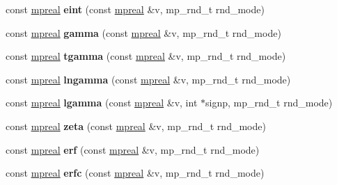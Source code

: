 \begin{DoxyCompactItemize}
\item 
\mbox{\label{classmpfr_1_1mpreal_a39102f5a371ae1643491e5d7dec13a81}} 
const \hyperlink{classmpfr_1_1mpreal}{mpreal} {\bfseries eint} (const \hyperlink{classmpfr_1_1mpreal}{mpreal} \&v, mp\+\_\+rnd\+\_\+t rnd\+\_\+mode)
\item 
\mbox{\label{classmpfr_1_1mpreal_adde0e2b6437e301a5774582f8b00ad39}} 
const \hyperlink{classmpfr_1_1mpreal}{mpreal} {\bfseries gamma} (const \hyperlink{classmpfr_1_1mpreal}{mpreal} \&v, mp\+\_\+rnd\+\_\+t rnd\+\_\+mode)
\item 
\mbox{\label{classmpfr_1_1mpreal_a4863b947198711044892196997f1e6f4}} 
const \hyperlink{classmpfr_1_1mpreal}{mpreal} {\bfseries tgamma} (const \hyperlink{classmpfr_1_1mpreal}{mpreal} \&v, mp\+\_\+rnd\+\_\+t rnd\+\_\+mode)
\item 
\mbox{\label{classmpfr_1_1mpreal_ada0178979f0f3dc3cb61401abb2e4496}} 
const \hyperlink{classmpfr_1_1mpreal}{mpreal} {\bfseries lngamma} (const \hyperlink{classmpfr_1_1mpreal}{mpreal} \&v, mp\+\_\+rnd\+\_\+t rnd\+\_\+mode)
\item 
\mbox{\label{classmpfr_1_1mpreal_a2076c489be59949d695f2b1a377e3516}} 
const \hyperlink{classmpfr_1_1mpreal}{mpreal} {\bfseries lgamma} (const \hyperlink{classmpfr_1_1mpreal}{mpreal} \&v, int $\ast$signp, mp\+\_\+rnd\+\_\+t rnd\+\_\+mode)
\item 
\mbox{\label{classmpfr_1_1mpreal_af22889e1fbd93f0e0de9fe9a5aaff66f}} 
const \hyperlink{classmpfr_1_1mpreal}{mpreal} {\bfseries zeta} (const \hyperlink{classmpfr_1_1mpreal}{mpreal} \&v, mp\+\_\+rnd\+\_\+t rnd\+\_\+mode)
\item 
\mbox{\label{classmpfr_1_1mpreal_a14db9a3ecbada0b2a5460e4438e4927a}} 
const \hyperlink{classmpfr_1_1mpreal}{mpreal} {\bfseries erf} (const \hyperlink{classmpfr_1_1mpreal}{mpreal} \&v, mp\+\_\+rnd\+\_\+t rnd\+\_\+mode)
\item 
\mbox{\label{classmpfr_1_1mpreal_afdd635eaa7eaa91800cfee95948926bd}} 
const \hyperlink{classmpfr_1_1mpreal}{mpreal} {\bfseries erfc} (const \hyperlink{classmpfr_1_1mpreal}{mpreal} \&v, mp\+\_\+rnd\+\_\+t rnd\+\_\+mode)

\end{DoxyCompactItemize}
